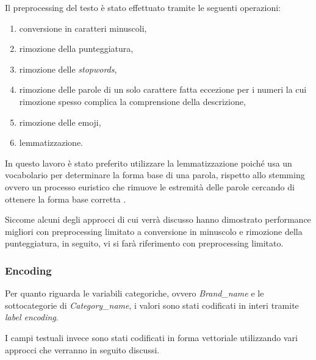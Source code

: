 Il preprocessing del testo è stato effettuato tramite le seguenti operazioni:
\begin{enumerate}
    \item conversione in caratteri minuscoli,
    \item rimozione della punteggiatura,
    \item rimozione delle \textit{stopwords},
    \item rimozione delle parole di un solo carattere fatta eccezione per i
    numeri la cui rimozione spesso complica la comprensione della descrizione,
    \item rimozione delle emoji,
    \item lemmatizzazione.
\end{enumerate}
In questo lavoro è stato preferito utilizzare la lemmatizzazione poiché usa un
vocabolario per determinare la forma base di una parola, rispetto allo stemming
ovvero un processo euristico che rimuove le estremità delle parole cercando di
ottenere la forma base corretta \cite{balakrishnan2014stemming}. 

Siccome alcuni degli approcci di cui verrà discusso hanno dimostrato performance
migliori con preprocessing limitato a conversione in minuscolo e rimozione della
punteggiatura, in seguito, vi si farà riferimento con preprocessing limitato.

\subsubsection{Encoding}

Per quanto riguarda le variabili categoriche, ovvero \textit{Brand\_name} e le
sottocategorie di \textit{Category\_name},
i valori sono stati codificati in interi tramite \textit{label encoding}.

I campi testuali invece sono stati codificati in forma vettoriale utilizzando
vari approcci che verranno in seguito discussi.


